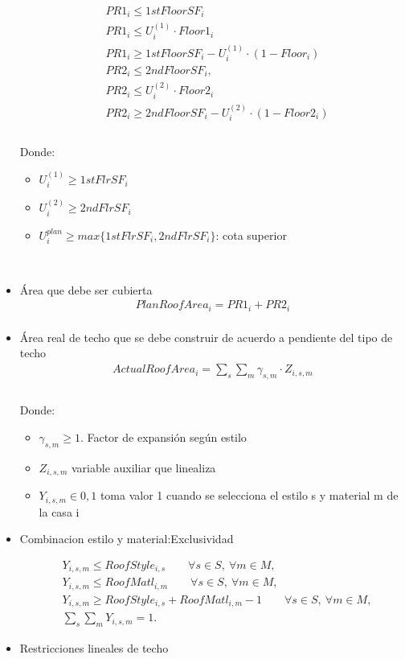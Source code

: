 \begin{itemize}
\begin{align}
    &PR1_{i} \leq 1stFloorSF_{i}\\
    &PR1_{i} \leq U_{i}^{(1)}\cdot Floor1_{i}\\
    &PR1_{i} \geq 1stFloorSF_{i}-U_{i}^{(1)}\cdot (1-Floor_{i})\\
    &PR2_{i} \leq 2ndFloorSF_{i},\\
    &PR2_{i} \leq U_{i}^{(2)}\cdot Floor2_{i}\\
    &PR2_{i} \geq 2ndFloorSF_{i}-U_{i}^{(2)}\cdot (1-Floor2_{i})\\
\end{align}
\\
Donde:
    \begin{itemize}
        \item $U_{i}^{(1)}\geq 1stFlrSF_{i}$
        \item $U_{i}^{(2)}\geq 2ndFlrSF_{i}$
        \item $U_{i}^{plan} \geq max\{1stFlrSF_{i},2ndFlrSF_{i}\}$: cota superior
    \end{itemize}
\\
    \item {Área que debe ser cubierta}\\
\begin{align}
    PlanRoofArea_{i}=PR1_{i}+PR2_{i}\\
\end{align}
\item{Área real de techo que se debe construir de acuerdo a pendiente del tipo de techo}\\
\begin{align}
    ActualRoofArea_{i}=\sum_{s}\sum_{m} \gamma_{s,m} \cdot Z_{i,s,m}\\
\end{align}
\\
Donde:
    \begin{itemize}
        \item $\gamma_{s,m} \geq 1$. Factor de expansión según estilo
        \item  $Z_{i,s,m}$ variable auxiliar que linealiza 
        \item $Y_{i,s,m} \in 0,1$ toma valor 1 cuando se selecciona el estilo s y material m de la casa i
\end{itemize}


    \item {Combinacion estilo y material:Exclusividad}

\begin{align}
& Y_{i,s,m} \le RoofStyle_{i,s} \qquad \forall s\in S,\ \forall m\in M, \\[2pt]
& Y_{i,s,m} \le RoofMatl_{i,m} \qquad \forall s\in S,\ \forall m\in M, \\[2pt]
& Y_{i,s,m} \ge RoofStyle_{i,s} + RoofMatl_{i,m} - 1 \qquad \forall s\in S,\ \forall m\in M, \\[4pt]
& \sum_{s}\sum_{m} Y_{i,s,m} = 1.
\end{align}
    \item {Restricciones lineales de techo}


\end{itemize}
